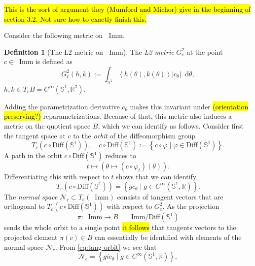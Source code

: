 \message{ !name(tangent_space_of_curves.tex)}\documentclass[a4,danish]{article}
\theoremstyle{break}
\theoremstyle{definition}
\newtheorem{definition}[subsection]{Definition}
\theoremstyle{Break}
\newcommand{\R}{\mathbb{R}}
\newcommand*\I{\mathop{}\!\mathrm{Imm}}
\renewcommand{\S}{\mathbb{S}}
\renewcommand{\phi}{\varphi}
\newcommand*\diff{\mathop{}\!\mathrm{d}}
\begin{document}
\hl{This is the sort of argument they (Mumford and Michor) give in the
  beginning of section 3.2. Not sure how to exactly finish this.}

Consider the following metric on $\I$.

\begin{definition}[The L2 metric on $\I$]
  The \textit{L2 metric} $G^2_c$ at the point $c \in \I$ is defined as
  \begin{equation*}
    G^2_c(h,k) := \int_{\S^{1}} \left\langle{h(\theta)
    , k(\theta)}\right\rangle |c_{\theta}| \diff \theta,
  \end{equation*}
  $h,k \in T_cB = C^{\infty}(\S^1,\R^2)$.
\end{definition}

Adding the parametrization derivative $c_{\theta}$ makes this
invariant under \hl{(orientation preserving?)}
reparametrizations. Because of that, this metric also induces a metric
on the quotient space $B$, which we can identify as follows. Consider
first the tangent space at $c$ to the \textit{orbit} of the diffeomorphism
group
\begin{equation*}
  T_c(c \circ \text{Diff}(\S^{1})), \quad c \circ
  \text{Diff}(\S^{1}) := 
  \left\{
    c \circ \phi \mid \phi \in \text{Diff}(\S^{1})
  \right\} .
\end{equation*}
A path in the orbit $c \circ \text{Diff}(\S^{1})$ reduces to
\begin{equation*}
  t \mapsto 
  \left(
    \theta \mapsto (c \circ \phi_t) (\theta)
\right).
\end{equation*}
Differentiating this with respect to $t$ shows that we can identify
\begin{equation}
  \label{eq:tang-orbit}
  T_c(c \circ \text{Diff}(\S^{1})) = 
  \left\{
    g c_{\theta} \mid g \in C^{\infty}(\S^1, \R)
  \right\}.
\end{equation}
The \textit{normal space} $\mathcal{N}_c \subset T_c(\I)$ consists of
tangent vectors that are orthogonal to $T_c(c \circ
\text{Diff}(\S^{1}))$ with respect to $G_c^2$. As the projection
\begin{equation*}
  \pi \colon \I \rightarrow B = \I/\text{Diff}(\S^{1})
\end{equation*}
sends the whole orbit to a single point \hl{it follows} that tangents
vectors to the projected element $\pi(c) \in B$ can essentially
be identified with elements of the normal space $\mathcal{N}_c$.
From \eqref{eq:tang-orbit} we see that
\begin{equation*}
  \mathcal{N}_c =
  \left\{
    g i c_{\theta} \mid g \in C^{\infty}(\S^1, \R)
  \right\},
\end{equation*}
\end{document}
